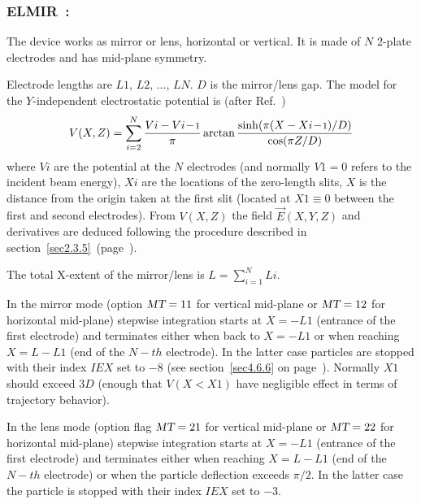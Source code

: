 {\vfill

\newpage

\subsubsection*{ELMIR~: \ELMIRTitl }\label{ELMIR}
\medskip

The device works as  mirror or lens, horizontal or vertical. 
It is made of $N$ 2-plate electrodes and has mid-plane symmetry.  
\bigskip

\noindent Electrode lengths are  $ L\!1 $, $ L\!2 $, ...,   $ L\!N$. $D$ is the  mirror/lens gap. 
The model for the $Y$-independent electrostatic potential is (after Ref.~\cite[p.412]{Karets}) 
$$ V(X,Z) = 
   \sum_{i=2}^{N} \dfrac{V{i}-V{i\!-\!\textrm{\footnotesize 1}} }{ \pi} 
     \arctan\dfrac{\sinh(\pi ( X - X{i\!-\!\textrm{\footnotesize 1}})/D)}{\cos(\pi Z/D)}   
$$
where $V\!i$ are the potential at the $N$ electrodes (and normally $V\!1=0$ refers to 
the incident beam energy),   $X\!i$ are the  locations of the zero-length slits, $ X $ is the distance 
from the origin taken at the first slit (located at $X\!1 \equiv 0$ between the first and 
second electrodes).  
 From $V(X,Z) $ the field $ \vec  E(X,Y,Z) $ and derivatives are deduced following the procedure 
described in section~\ref{sec2.3.5}~(page~\pageref{sec2.3.5}).  

\medskip

\noindent The total X-extent of the mirror/lens is $L = \sum_{i=1}^N L\!i$.

\medskip

\noindent In the mirror mode (option  $\textsl{MT}=11$ for vertical mid-plane  or $\textsl{MT}=12$ 
for horizontal mid-plane) stepwise integration starts 
at $X=-L\!1$ (entrance of the first electrode) and terminates either when back to   $X=-L\!1$  
or when  reaching $ X=L-L\!1$ (end of the $N-th$ electrode). 
In the latter case particles  are stopped  with their index
 $I\!E\!X$ set to $-8$ (see section~\ref{sec4.6.6} on page~\pageref{sec4.6.6}). 
Normally $X\!1$ should   exceed  $3D$ (enough that $V(X<X\!1)$   have negligible effect in terms of trajectory behavior).  

\medskip

\noindent In the lens mode (option flag $\textsl{MT}=21$ for vertical mid-plane  or $\textsl{MT}=22$
for horizontal mid-plane) stepwise integration starts
at $X=-L\!1$ (entrance of the first electrode) and terminates either when reaching $ X=L-L\!1$ (end of the $N-th$ electrode) 
or when the particle deflection exceeds $\pi/2$. In the latter case the particle is stopped  with their index
 $I\!E\!X$ set to $-3$. 
 
}
